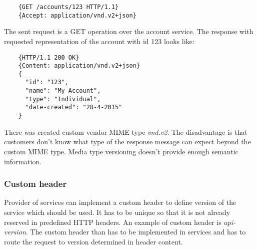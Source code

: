 \begin{lstlisting}
    {GET /accounts/123 HTTP/1.1}
    {Accept: application/vnd.v2+json}
\end{lstlisting}

The sent request is a GET operation over the account service. The response with requested representation of the account with id 123 looks like:

\begin{lstlisting}
    {HTTP/1.1 200 OK}
    {Content: application/vnd.v2+json}
    {
      "id": "123",
      "name": "My Account",
      "type": "Individual",
      "date-created": "28-4-2015"
    }       
\end{lstlisting}

There was created custom vendor MIME type \emph{vnd.v2}. The disadvantage is that customers don't know what type of the response message can expect beyond the custom MIME type. Media type versioning doesn't provide enough semantic information.





\subsubsection{Custom header}
Provider of services can implement a custom header to define version of the service which should be used. It has to be unique so that it is not already reserved in predefined HTTP headers. An example of custom header is \emph{api-version}. The custom header than has to be implemented in services and has to route the request to version determined in header content.

